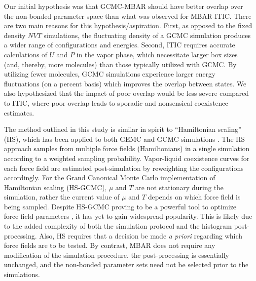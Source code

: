 \documentclass[journal=jced,manuscript=article]{achemso}
\begin{document}

Our initial hypothesis was that GCMC-MBAR should have better overlap over the non-bonded parameter space than what was observed for MBAR-ITIC. There are two main reasons for this hypothesis/aspiration. First, as opposed to the fixed density $NVT$ simulations, the fluctuating density of a GCMC simulation produces a wider range of configurations and energies. Second, ITIC requires accurate calculations of $U$ and $P$ in the vapor phase, which necessitate larger box sizes (and, thereby, more molecules) than those typically utilized with GCMC. By utilizing fewer molecules, GCMC simulations experience larger energy fluctuations (on a percent basis) which improves the overlap between states. We also hypothesized that the impact of poor overlap would be less severe compared to ITIC, where poor overlap leads to sporadic and nonsensical coexistence estimates.  



The method outlined in this study is similar in spirit to ``Hamiltonian scaling'' (HS), which has been applied to both GEMC and GCMC simulations \cite{Errington1998,Exp6,Errington1999,Pana2000}. The HS approach samples from multiple force fields (Hamiltonians) in a single simulation according to a weighted sampling probability. Vapor-liquid coexistence curves for each force field are estimated post-simulation by reweighting the configurations accordingly. For the Grand Canonical Monte Carlo implementation of Hamiltonian scaling (HS-GCMC), $\mu$ and $T$ are not stationary during the simulation, rather the current value of $\mu$ and $T$ depends on which force field is being sampled. Despite HS-GCMC proving to be a powerful tool to optimize force field parameters \cite{Errington1998,Exp6,Errington1999,Pana2000}, it has yet to gain widespread popularity. This is likely due to the added complexity of both the simulation protocol and the histogram post-processing. Also, HS requires that a decision be made \textit{a priori} regarding which force fields are to be tested. By contrast, MBAR does not require any modification of the simulation procedure, the post-processing is essentially unchanged, and the non-bonded parameter sets need not be selected prior to the simulations.
\end{document}
